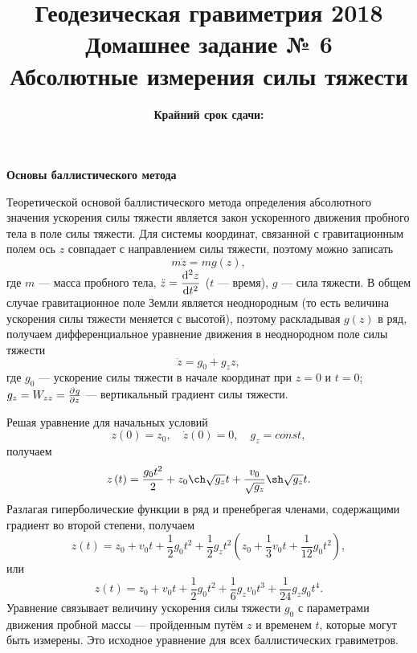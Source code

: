 \documentclass[12pt, a4paper]{article}
\title{{\Large Геодезическая гравиметрия 2018}\\ 
    {\bf\Large Домашнее задание № 6} \\
    {\bf\Large Абсолютные измерения силы тяжести}
}
\author{}
\date{\normalsize\bf Крайний срок сдачи: \DTMusedate{deadline}}
\theoremstyle{remark}
\begin{document}
\maketitle
\thispagestyle{empty}
\begin{center}
    \textbf{Основы баллистического метода}
\end{center}

Теоретической основой баллистического метода определения абсолютного значения ускорения силы тяжести
является закон ускоренного движения пробного тела в поле силы тяжести. Для системы координат,
связанной с гравитационным полем ось $z$ совпадает с направлением силы тяжести, поэтому можно записать
\begin{equation*}
    m \ddot{z} = mg\left( z \right),
\end{equation*}
где $m$ --- масса пробного тела, $\ddot{z} = \dod[2]{z}{t}$ ($t$ --- время),
$g$ --- сила тяжести. 
В общем случае гравитационное поле Земли является неоднородным (то есть величина ускорения силы
тяжести меняется с высотой), поэтому раскладывая $g\left( z
\right)$ в ряд, получаем дифференциальное уравнение движения в неоднородном поле
силы тяжести
\begin{equation*}
    \ddot{z} = g_0 + g_z z,
\end{equation*}
где $g_0$ --- ускорение силы тяжести в начале координат при $z = 0$ и $t = 0$; $g_z = W_{zz} =
\pd{g}{z}$ --- вертикальный градиент силы тяжести.

Решая уравнение для начальных условий 
\begin{equation*}
    z\left( 0 \right) = z_0,\quad \dot{z}\left( 0 \right) = 0,\quad g_z = const, 
\end{equation*}
получаем
\begin{equation*}
    z\left( t \right) = \dfrac{g_0 t^2}{2} + z_0\ch\sqrt{g_z}t +
    \dfrac{v_0}{\sqrt{g_z}}\sh\sqrt{g_z}t.
\end{equation*}
Разлагая гиперболические функции в ряд и пренебрегая членами, содержащими градиент во второй
степени, получаем
\begin{equation*}
    z\left( t \right) = z_0 + v_0t + \dfrac{1}{2} g_0 t^2 + \dfrac{1}{2}g_zt^2\left( 
        z_0 + \dfrac{1}{3} v_0 t + \dfrac{1}{12} g_0 t^2
    \right),
\end{equation*}
или
\begin{equation}
    \label{eq:basic-freefall}
    z\left( t \right) = z_0 + v_0t + \dfrac{1}{2} g_0 t^2 + 
    \dfrac{1}{6}g_z v_0 t^3 +  
    \dfrac{1}{24}g_z g_0 t^4.
\end{equation}
Уравнение связывает величину ускорения силы тяжести $g_0$ с параметрами движения пробной массы ---
пройденным путём $z$ и временем $t$, которые могут быть измерены. Это исходное уравнение для всех
баллистических гравиметров.
\end{document}
